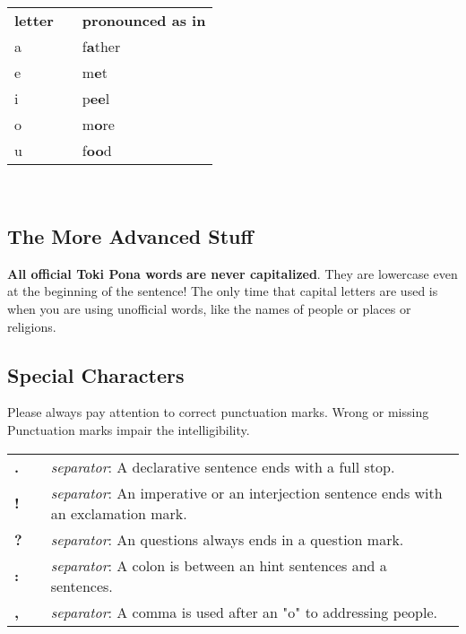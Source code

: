 \begin{supertabular}{p{2,5cm}|ll}
\textbf{letter}   &&    \textbf{pronounced as in} \\ %
a   &&    f\textbf{a}ther \\ %
e   &&    m\textbf{e}t \\ %
i   &&    p\textbf{ee}l \\ %
o   &&    m\textbf{o}re \\ %
u   &&    f\textbf{oo}d \\ %
\end{supertabular} \\
%
\subsection*{The More Advanced Stuff}
%
\textbf{All official Toki Pona words} 
\textbf{are never capitalized}. They are lowercase even at the beginning of the sentence! 
The only time that capital letters are used is when you are using unofficial words, like the names of people or places or religions. 
%
%
\subsection*{Special Characters}
%
Please always pay attention to correct punctuation marks. Wrong or missing
Punctuation marks impair the intelligibility.

\begin{supertabular}{p{2,5cm}|ll}
\textbf{.} && \textit{separator}: A declarative sentence ends with a full stop. \\ %
\textbf{!} && \textit{separator}: An imperative or an interjection sentence ends with an exclamation mark. \\ %
\textbf{?} && \textit{separator}: An questions always ends in a question mark. \\ %
\textbf{:} && \textit{separator}: A colon is between an hint sentences and a sentences. \\  %
\textbf{,} && \textit{separator}: A comma is used after an "o" to addressing people. \\ %
\end{supertabular} \\
%
